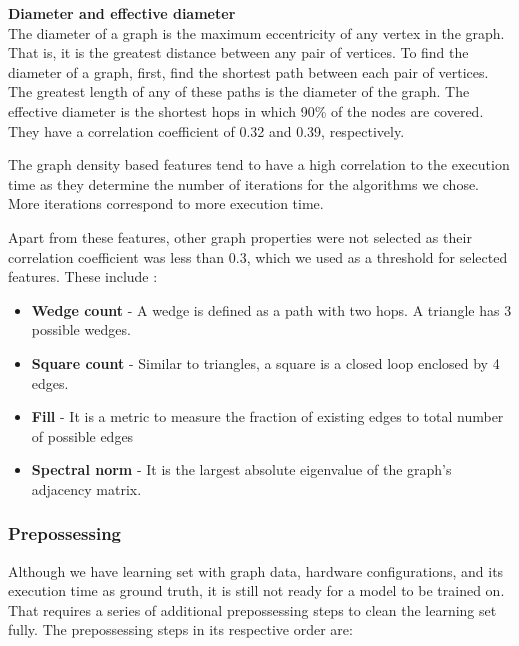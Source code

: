 \textbf{Diameter and effective diameter}\\
The diameter of a graph is the maximum eccentricity of any vertex in the graph. That is, it is the greatest distance between any pair of vertices. To find the diameter of a graph, first, find the shortest path between each pair of vertices. The greatest length of any of these paths is the diameter of the graph. The effective diameter is the shortest hops in which 90\% of the nodes are covered. They have a correlation coefficient of 0.32 and 0.39, respectively. 

The graph density based features tend to have a high correlation to the execution time as they determine the number of iterations for the algorithms we chose. More iterations correspond to more execution time. 

Apart from these features, other graph properties were not selected as their correlation coefficient was less than 0.3, which we used as a threshold for selected features. These include :
\begin{itemize}
    \item \textbf{Wedge count} - A wedge is defined as a path with two hops. A triangle has 3 possible wedges.
    \item \textbf{Square count} - Similar to triangles, a square is a closed loop enclosed by 4 edges.
    \item \textbf{Fill} - It is a metric to measure the fraction of existing edges to total number of possible edges
    \item \textbf{Spectral norm} - It is the largest absolute eigenvalue of the graph's adjacency matrix.
\end{itemize}



\subsubsection{Prepossessing}
Although we have learning set with graph data, hardware configurations, and its execution time as ground truth, it is still not ready for a model to be trained on. That requires a series of additional prepossessing steps to clean the learning set fully. The prepossessing steps in its respective order are: 

